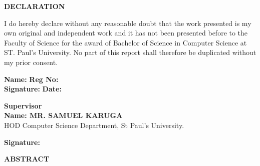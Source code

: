\documentclass[a4paper,12pt]{report}
\begin{document}
\begin{center}
    {\LARGE \textbf{DECLARATION}}
\end{center}

\vspace{1cm}

I do hereby declare without any reasonable doubt that the work presented is my own original and independent work and it has not been presented before to the Faculty of Science for the award of Bachelor of Science in Computer Science at ST. Paul’s University. No part of this report shall therefore be duplicated without my prior consent.

\vspace{2cm}

\begin{flushleft}
    \textbf{Name:} \underline{\hspace{4cm}} 
    \textbf{Reg No:} \underline{\hspace{4cm}} \\
    \vspace{0.5cm}
    \textbf{Signature:} \underline{\hspace{4cm}} \hspace{1cm} \textbf{Date:} \underline{\hspace{4cm}} \\
\end{flushleft}

\vspace{2cm}

\begin{flushleft}
    \textbf{Supervisor} \\

    \textbf{Name: MR. SAMUEL KARUGA} \\
    HOD Computer Science Department, St Paul’s University.
    
    \vspace{0.5cm}
    \textbf{Signature:} \underline{\hspace{4cm}}
\end{flushleft}

\vfill
\newpage

\newpage

\begin{center}
    {\LARGE \textbf{ABSTRACT}}
\end{center}
\end{document}
